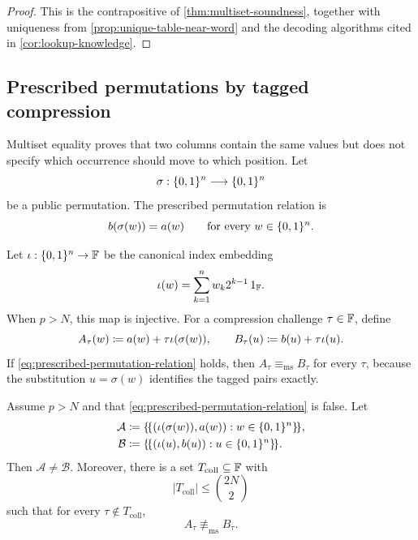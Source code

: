 \begin{proof}
This is the contrapositive of \cref{thm:multiset-soundness}, together with uniqueness from \cref{prop:unique-table-near-word} and the decoding algorithms cited in \cref{cor:lookup-knowledge}.
\end{proof}

\subsection{Prescribed permutations by tagged compression}
\label{sec:tagged-permutation}

Multiset equality proves that two columns contain the same values but does not specify which occurrence should move to which position.  Let
\begin{equation}
  \sigma:\{0,1\}^n\longrightarrow\{0,1\}^n
  \label{eq:known-permutation}
\end{equation}
be a public permutation.  The prescribed permutation relation is
\begin{equation}
  b(\sigma(w))=a(w)
  \qquad\text{for every }w\in\{0,1\}^n.
  \label{eq:prescribed-permutation-relation}
\end{equation}

Let $\iota:\{0,1\}^n\to\mathbb{F}$ be the canonical index embedding
\begin{equation}
  \iota(w)=\sum_{k=1}^n w_k2^{k-1}\,1_{\mathbb{F}}.
  \label{eq:index-embedding}
\end{equation}
When $p>N$, this map is injective.  For a compression challenge $\tau\in\mathbb{F}$, define
\begin{equation}
  A_\tau(w)
  \coloneqq a(w)+\tau\iota(\sigma(w)),
  \qquad
  B_\tau(u)
  \coloneqq b(u)+\tau\iota(u).
  \label{eq:tagged-compressed-columns}
\end{equation}
If \eqref{eq:prescribed-permutation-relation} holds, then $A_\tau\equiv_{\mathrm{ms}}B_\tau$ for every $\tau$, because the substitution $u=\sigma(w)$ identifies the tagged pairs exactly.

\begin{lemma}
\label{lem:tagged-compression}
Assume $p>N$ and that \eqref{eq:prescribed-permutation-relation} is false.  Let
\begin{align}
  \mathcal A
  &\coloneqq
  \{\!\{(\iota(\sigma(w)),a(w)):w\in\{0,1\}^n\}\!\},
  \label{eq:tagged-multiset-a}\\
  \mathcal B
  &\coloneqq
  \{\!\{(\iota(u),b(u)):u\in\{0,1\}^n\}\!\}.
  \label{eq:tagged-multiset-b}
\end{align}
Then $\mathcal A\ne\mathcal B$.  Moreover, there is a set $T_{\mathrm{coll}}\subseteq\mathbb{F}$ with
\begin{equation}
  |T_{\mathrm{coll}}|
  \le \binom{2N}{2}
  \label{eq:tag-collision-count}
\end{equation}
such that for every $\tau\notin T_{\mathrm{coll}}$,
\begin{equation}
  A_\tau\not\equiv_{\mathrm{ms}}B_\tau.
  \label{eq:tagged-compression-detects}
\end{equation}
\end{lemma}

